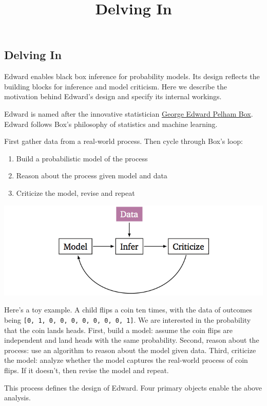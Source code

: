 \title{Delving In}

\subsection{Delving In}

Edward enables black box inference for probability models. Its design reflects
the building blocks for inference and model criticism. Here we describe the
motivation behind Edward's design and specify its internal workings.

Edward is named after the innovative statistician
\href{https://en.wikipedia.org/wiki/George_E._P._Box}{George Edward
Pelham Box}. Edward follows Box's philosophy of statistics and machine
learning.

First gather data from a real-world process. Then cycle through Box's
loop:

\begin{enumerate}
\item Build a probabilistic model of the process
\item Reason about the process given model and data
\item Criticize the model, revise and repeat
\end{enumerate}

\includegraphics{images/model_infer_criticize.png}

Here's a toy example. A child flips a coin ten times, with the data of
outcomes being \texttt{{[}0,\ 1,\ 0,\ 0,\ 0,\ 0,\ 0,\ 0,\ 0,\ 1{]}}. We
are interested in the probability that the coin lands heads. First,
build a model: assume the coin flips are independent and land heads with
the same probability. Second, reason about the process: use an algorithm
to reason about the model given data. Third, criticize the model: analyze
whether the model captures the real-world process of coin flips. If it
doesn't, then revise the model and repeat.

This process defines the design of Edward. Four primary objects enable the
above analysis.

